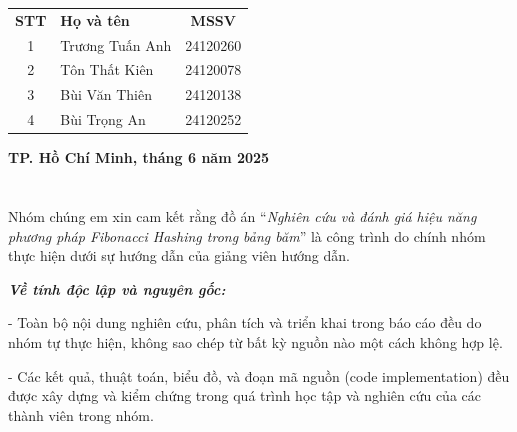 \documentclass[12pt,a4paper]{report}
\begin{document}
\begin{center}
{\begin{minipage}{0.95\textwidth}
\begin{center}
                \renewcommand{\arraystretch}{1.2}
                \begin{tabular}{ c  l  c }
                
                    \textbf{STT} & \textbf{Họ và tên} & \textbf{MSSV} \\
                    
                    1 & Trương Tuấn Anh & 24120260 \\
                    2 & Tôn Thất Kiên & 24120078 \\
                    3 & Bùi Văn Thiên & 24120138 \\
                    4 & Bùi Trọng An & 24120252 \\
                
                \end{tabular}
                
                \vspace{11em}
                \textbf{TP. Hồ Chí Minh, tháng 6 năm 2025}
                \\[3em]
                \textbf{ }
            \end{center}
        \end{minipage}
    }
\end{center}

\newpage
{}
\setcounter{page}{1}

\chapter*{}

\setlength{\parindent}{2em}   %
\setlength{\parskip}{0.5em}     %

\noindent \indent Nhóm chúng em xin cam kết rằng đồ án “\textit{Nghiên cứu và đánh giá hiệu năng phương pháp Fibonacci Hashing trong bảng băm}” là công trình do chính nhóm thực hiện dưới sự hướng dẫn của giảng viên hướng dẫn.

\textbf{\textit{Về tính độc lập và nguyên gốc:}}

- Toàn bộ nội dung nghiên cứu, phân tích và triển khai trong báo cáo đều do nhóm tự thực hiện, không sao chép từ bất kỳ nguồn nào một cách không hợp lệ.

- Các kết quả, thuật toán, biểu đồ, và đoạn mã nguồn (code implementation) đều được xây dựng và kiểm chứng trong quá trình học tập và nghiên cứu của các thành viên trong nhóm.
\end{document}
